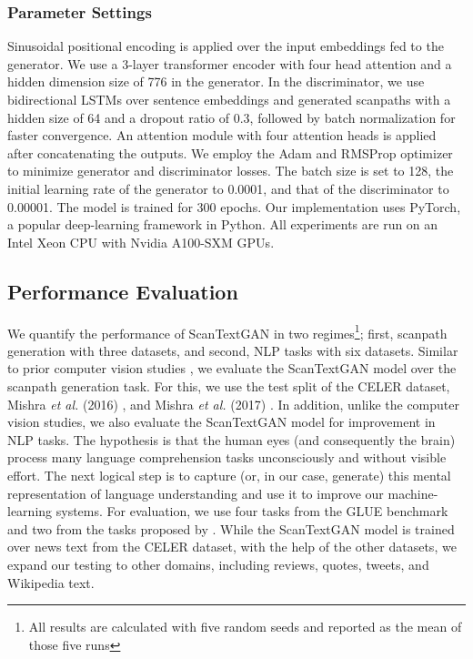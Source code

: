 \subsubsection{Parameter Settings}
Sinusoidal positional encoding is applied over the input embeddings fed to the generator. We use a 3-layer transformer encoder with four head attention and a hidden dimension size of 776 in the generator. In the discriminator, we use bidirectional LSTMs over sentence embeddings and generated scanpaths with a hidden size of 64 and a dropout ratio of 0.3, followed by batch normalization for faster convergence. An attention module with four attention heads is applied after concatenating the outputs.
We employ the Adam and RMSProp optimizer to minimize generator and discriminator losses. The batch size is set to 128, the initial learning rate of the generator to 0.0001, and that of the discriminator to 0.00001. The model is trained for 300 epochs. Our implementation uses PyTorch, a popular deep-learning framework in Python. All experiments are run on an Intel Xeon CPU with Nvidia A100-SXM GPUs.



\subsection{Performance Evaluation}
\label{sec:Performance Evaluation}
We quantify the performance of ScanTextGAN in two regimes\footnote{All results are calculated with five random seeds and reported as the mean of those five runs}; first, scanpath generation with three datasets, and second, NLP tasks with six datasets. Similar to prior computer vision studies \cite{sun2019visual,de2022scanpathnet,kummerer2021state,jiang2016learning}, we evaluate the ScanTextGAN model over the scanpath generation task. For this, we use the test split of the CELER dataset, Mishra \textit{et al.} (2016) \cite{mishra2016predicting}, and Mishra \textit{et al.} (2017) \cite{Mishra_Kanojia_Nagar_Dey_Bhattacharyya_2017}. In addition, unlike the computer vision studies, we also evaluate the ScanTextGAN model for improvement in NLP tasks. The hypothesis is that the human eyes (and consequently the brain) process many language comprehension tasks unconsciously and without visible effort. The next logical step is to capture (or, in our case, generate) this mental representation of language understanding and use it to improve our machine-learning systems. For evaluation, we use four tasks from the GLUE benchmark and two from the tasks proposed by \cite{mishra2016predicting}. While the ScanTextGAN model is trained over news text from the CELER dataset, with the help of the other datasets, we expand our testing to other domains, including reviews, quotes, tweets, and Wikipedia text. 


